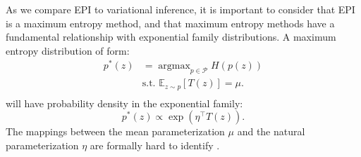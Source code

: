 \documentclass[11pt]{article}
\DeclareMathOperator*{\argmax}{argmax}
\begin{document}
As we compare EPI to variational inference, it is important to consider that EPI is a maximum entropy method, and that maximum entropy methods have a fundamental relationship with exponential family distributions. A maximum entropy distribution of form:
\begin{equation}
\begin{split}
p^*(z) &= \argmax_{p \in \mathcal{P}} H(p(z)) \\
 &  \text{s.t.  } \mathbb{E}_{z \sim p}\left[T(z)\right] = \mu. \\
 \end{split}
\end{equation} 
will have probability density in the exponential family:
\begin{equation}
p^*(z) \propto \exp(\eta^\top T(z)).
\end{equation}
The mappings between the mean parameterization $\mu$ and the natural parameterization $\eta$ are formally hard to identify \cite{wainwright2008graphical}.
\end{document}
